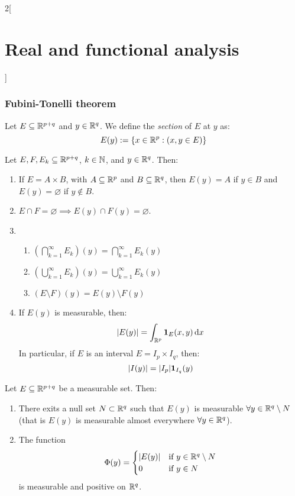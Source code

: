 \documentclass[../../../main_math.tex]{subfiles}
\begin{document}
\begin{multicols}{2}[\section{Real and functional analysis}]
  \subsubsection{Fubini-Tonelli theorem}
  \begin{definition}
    Let $E\subseteq\mathbb{R}^{p+q}$ and $y\in\mathbb{R}^q$. We define the \emph{section} of $E$ at $y$ as: $$E(y):=\{x\in\mathbb{R}^p:(x,y\in E)\}$$
  \end{definition}
  \begin{proposition}
    Let $E,F,E_k\subseteq\mathbb{R}^{p+q}$, $k\in\mathbb{N}$, and $y\in\mathbb{R}^q$. Then:
    \begin{enumerate}
      \item If $E= A\times B$, with $A\subseteq \mathbb{R}^p$ and $B\subseteq \mathbb{R}^q$, then $E(y)=A$ if $y\in B$ and $E(y)=\varnothing$ if $y\notin B$.
      \item $E\cap F=\varnothing\implies E(y)\cap F(y)=\varnothing$.
      \item \hfill\begin{enumerate}
              \item $\displaystyle\left(\bigcap_{k=1}^\infty E_k\right)(y)=\bigcap_{k=1}^\infty E_k(y)$
              \item $\displaystyle\left(\bigcup_{k=1}^\infty E_k\right)(y)=\bigcup_{k=1}^\infty E_k(y)$
              \item $\displaystyle\left(E\setminus F\right)(y)=E(y)\setminus F(y)$
            \end{enumerate}
      \item If $E(y)$ is measurable, then: $$\m{E(y)}=\int_{\RR^p}\indi{E}(x,y)\dd{x}$$ In particular, if $E$ is an interval $E=I_p\times I_q$, then: $$\m{I(y)}=\m{I_p}\indi{I_q}(y)$$
    \end{enumerate}
  \end{proposition}
  \begin{lemma}
    Let $E\subseteq\mathbb{R}^{p+q}$ be a measurable set. Then:
    \begin{enumerate}
      \item There exits a null set $N\subset \mathbb{R}^q$ such that $E(y)$ is measurable $\forall y\in\mathbb{R}^q\setminus N$ (that is $E(y)$ is measurable almost everywhere $\forall y\in\mathbb{R}^q$).
      \item The function $$\Phi(y)=\begin{cases}
                \m{E(y)} & \text{if } y\in\RR^q\setminus N \\
                0        & \text{if } y\in N
              \end{cases}$$ is measurable and positive on $\mathbb{R}^q$.

\end{enumerate}
\end{lemma}
\end{multicols}
\end{document}
